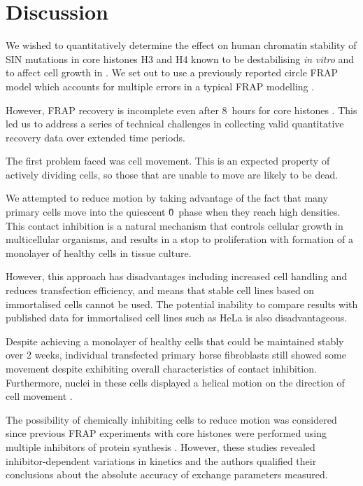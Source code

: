 \section{Discussion}

    We wished to quantitatively determine the
    effect on human chromatin stability
    of SIN mutations in core histones H3 and H4 known
    to be destabilising \textit{in vitro} and to affect
    cell growth in .
    We set out to use a previously reported circle FRAP model
    which accounts for multiple errors in a typical FRAP modelling .

    However, FRAP recovery is incomplete even
    after 8~hours for core histones \citep{KimuraCook}.
    This led us to address a series of technical challenges in
    collecting valid quantitative recovery data over extended time periods.


    The first problem faced was cell movement.
    This is an expected property of actively dividing cells,
    so those that are unable to move are likely to be dead.

    We attempted to reduce motion by taking advantage of
    the fact that many primary cells move into the
    quiescent \G0{}~phase when they reach high densities.
    This contact inhibition is a natural mechanism
    that controls cellular growth in
    multicellular organisms, and results in a stop to proliferation
    with formation of a monolayer of healthy cells in tissue culture.

    However, this approach has disadvantages including
    increased cell handling and reduces transfection efficiency,
    and means that stable cell lines based on
    immortalised cells cannot be used.
    The potential inability to compare results with published data for
    immortalised cell lines such as HeLa is also disadvantageous.

    Despite achieving a monolayer of healthy cells that
    could be maintained stably over 2 weeks,
    individual transfected primary horse fibroblasts still showed some movement
    despite exhibiting overall characteristics of contact inhibition.
    Furthermore, nuclei in these cells displayed a helical motion
    on the direction of cell movement .

    The possibility of chemically inhibiting
    cells to reduce motion was considered
    since previous FRAP experiments with core
    histones were performed using multiple inhibitors
    of protein synthesis \citep{KimuraCook}. However, these studies revealed
    inhibitor-dependent variations in kinetics and the authors qualified
    their conclusions about the absolute accuracy
    of exchange parameters measured.

